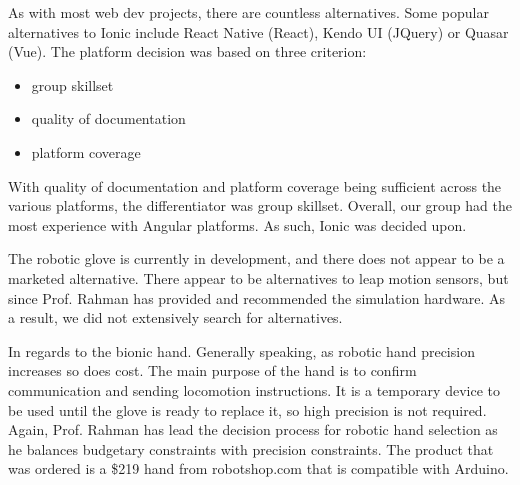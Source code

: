 \documentclass[a4paper,10pt]{article}
\begin{document}
        As with most web dev projects, there are countless alternatives. Some popular alternatives to Ionic include React Native (React), Kendo UI (JQuery) or Quasar (Vue). The platform decision was based on three criterion: 
        \begin{itemize}
         \item group skillset
         \item quality of documentation
         \item platform coverage
        \end{itemize}
        With quality of documentation and platform coverage being sufficient across the various platforms, the differentiator was group skillset. Overall, our group had the most experience with Angular platforms. As such, Ionic was decided upon.
        
        The robotic glove is currently in development, and there does not appear to be a marketed alternative. There appear to be alternatives to leap motion sensors, but since Prof. Rahman has provided and recommended the simulation hardware. As a result, we did not extensively search for alternatives. 
        
        In regards to the bionic hand. Generally speaking, as robotic hand precision increases so does cost. The main purpose of the hand is to confirm communication and sending locomotion instructions. It is a temporary device to be used until the glove is ready to replace it, so high precision is not required.  Again, Prof. Rahman has lead the decision process for robotic hand selection as he balances budgetary constraints with precision constraints. The product that was ordered is a \$219 hand from robotshop.com that is compatible with Arduino.
\end{document}
